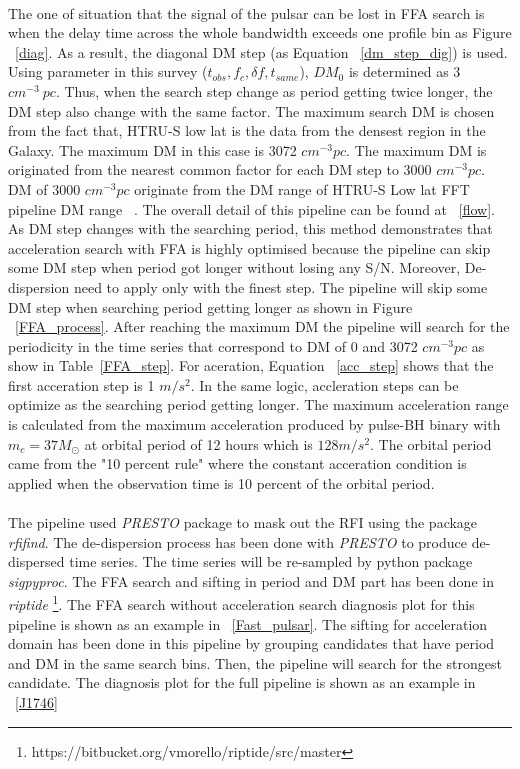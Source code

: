 \documentclass[thesis_msc.tex]{subfiles}
\begin{document}
\paragraph{} The one of situation that the signal of the pulsar can be lost in FFA search is when the delay time across the whole bandwidth exceeds one profile bin as Figure ~\ref{diag}. As a result, the diagonal DM step (as Equation ~\ref{dm_step_dig}) is used. Using parameter in this survey ($t_{obs},f_c,\delta f,t_{same}$), $DM_0$ is determined as 3 $ cm^{-3}~pc$. Thus, when the search step change as period getting twice longer, the DM step also change with the same factor. The maximum search DM is chosen from the fact that, HTRU-S low lat is the data from the densest region in the Galaxy. The maximum DM in this case is 3072 $cm^{-3}pc$. The maximum DM is originated from the nearest common factor for each DM step to 3000 $cm^{-3}pc$. DM of 3000 $cm^{-3}pc$  originate from the DM range of HTRU-S Low lat FFT pipeline DM range ~\citep{ng2015high}. The overall detail of this pipeline can be found at ~\ref{flow}. As DM step changes with the searching period, this method demonstrates that acceleration search with FFA is highly optimised because the pipeline can skip some DM step when period got longer without losing any S/N. Moreover, De-dispersion need to apply only with the finest step. The pipeline will skip some DM step when searching period getting longer as shown in Figure ~\ref{FFA_process}. After reaching the maximum DM the pipeline will search for the periodicity in the time series that correspond to DM of 0 and 3072 $cm^{-3} pc$ as show in Table~\ref{FFA_step}. For aceration, Equation ~\ref{acc_step} shows that the first acceration step is 1 $m/s^2$. In the same logic, accleration steps can be optimize as the searching period getting longer. The maximum acceleration range is calculated from the maximum acceleration produced by pulse-BH binary with $m_c=37 M_{\odot}$ at orbital period of 12 hours which is $128 m/s^2$. The orbital period came from the "10 percent rule" where the constant acceration condition is applied when the observation time is 10 percent of the orbital period. 

\paragraph{} The pipeline used \textit{PRESTO} package to mask out the RFI using the package \textit{rfifind}. The de-dispersion process has been done with \textit{PRESTO} to produce de-dispersed time series. The time series will be re-sampled by python package \textit{sigpyproc}. The FFA search and sifting in period and DM part has been done in \textit{riptide} \footnote{https://bitbucket.org/vmorello/riptide/src/master}. The FFA search without acceleration search diagnosis plot for this pipeline is shown as an example in ~\ref{Fast_pulsar}. The sifting for acceleration domain has been done in this pipeline by grouping candidates that have period and DM in the same search bins. Then, the pipeline will search for the strongest candidate. The diagnosis plot for the full pipeline is shown as an example in ~\ref{J1746}   
\end{document}

